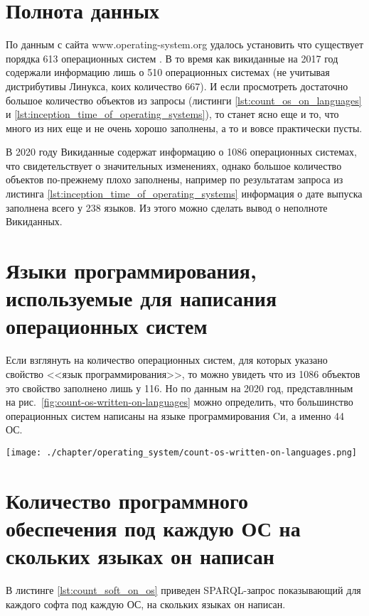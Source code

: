 \section{Полнота данных}
По данным с сайта www.operating-system.org удалось установить что существует порядка 613 операционных систем \cite{list_operating_systems}. В то время как викиданные на 2017 год содержали информацию лишь о 510 операционных системах (не учитывая дистрибутивы Линукса, коих количество 667). И если просмотреть достаточно большое количество объектов из запросы (листинги \ref{lst:count_os_on_languages} и \ref{lst:inception_time_of_operating_systems}), то станет ясно еще и то, что много из них еще и не очень хорошо заполнены, а то и вовсе практически пусты.

В 2020 году Викиданные содержат информацию о 1086 операционных системах, что свидетельствует о значительных изменениях, однако большое количество объектов по-прежнему плохо заполнены, например по результатам запроса из листинга \ref{lst:inception_time_of_operating_systems} информация о дате выпуска заполнена всего у \num{238} языков. Из этого можно сделать вывод о неполноте Викиданных.

\section{Языки программирования, используемые для написания операционных систем}
Если взглянуть на количество операционных систем, для которых указано свойство <<язык программирования>>, то можно увидеть что из \num{1086} объектов это свойство заполнено лишь у \num{116}. Но по данным на 2020 год, представлнным на рис.~\ref{fig:count-os-written-on-languages} можно определить, что большинство операционных систем написаны на языке программирования Cи, а именно 44 ОС.


\begin{figure*}[h!]
	\texttt{[image: ./chapter/operating\_system/count-os-written-on-languages.png]}
	\caption{Количество операционных систем, написанных на языках программирования (данные на 2020 год.)}
	\label{fig:count-os-written-on-languages}
\end{figure*}


\section{Количество программного обеспечения под каждую ОС на скольких языках он написан}
В листинге \ref{lst:count_soft_on_os} приведен SPARQL-запрос показывающий для каждого софта под каждую ОС, на скольких языках он написан.

